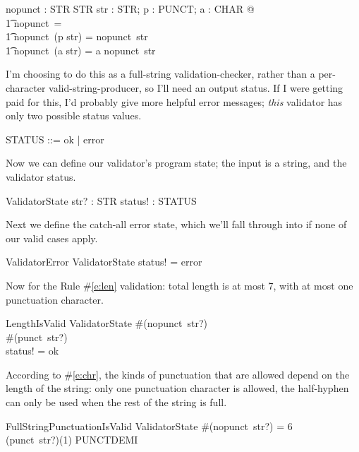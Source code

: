 \documentclass[11pt]{article}
\begin{document}
\begin{axdef}
  nopunct : STR \fun STR
  \where
  \forall str : STR; p : PUNCT; a : CHAR  @ \\
  \t1 nopunct~\langle \rangle = \langle \rangle \land \\
  \t1 nopunct~(\langle p \rangle \cat str) = nopunct~str \land \\
  \t1 nopunct~(\langle a \rangle \cat str) = \langle a \rangle \cat nopunct~str
\end{axdef}

I'm choosing to do this as a full-string validation-checker, rather than a per-character
valid-string-producer, so I'll need an output status.  If I were getting paid for this, I'd probably
give more helpful error messages; \textit{this} validator has only two possible status values.

\begin{zed}
  STATUS ::= ok | error
\end{zed}

Now we can define our validator's program state; the input is a string, and the validator status.

\begin{schema}{ValidatorState}
  str? : STR \also
  status! : STATUS
\end{schema}

Next we define the catch-all error state, which we'll fall through into if none of our valid cases
apply.

\begin{schema}{ValidatorError}
  ValidatorState
  \where
  status! = error
\end{schema}

Now for the Rule \#\ref{e:len} validation: total length is at most 7, with at most one punctuation
character.

\begin{schema}{LengthIsValid}
  ValidatorState
  \where
  \#(nopunct~str?)  \\
  \#(punct~str?)    \\
  status! = ok
\end{schema}

According to \#\ref{e:chr}, the kinds of punctuation that are allowed depend on the length of the
string: only one punctuation character is allowed, the half-hyphen can only be used when the rest
of the string is full.

\begin{schema}{FullStringPunctuationIsValid}
  ValidatorState
  \where
  \#(nopunct~str?) = 6 \\
  (punct~str?)(1) \in PUNCTDEMI
\end{schema}
\end{document}
